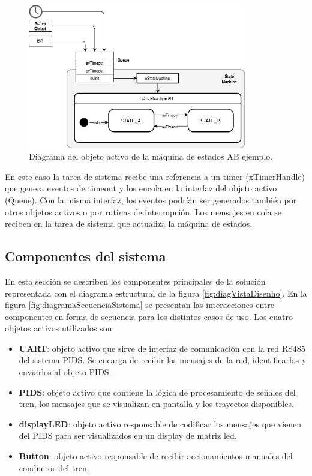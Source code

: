 \begin{figure}[ht]
	\centering
	\includegraphics[width=0.85\textwidth]{./Figures/AOstatemachineAB.png}
	\caption{Diagrama del objeto activo de la máquina de estados AB ejemplo.}
	\label{fig:AOfsmAB}
\end{figure}

En este caso la tarea de sistema recibe una referencia a un timer (xTimerHandle) que genera eventos de timeout y los encola en la interfaz del objeto activo (Queue). Con la misma interfaz, los eventos podrían ser generados también por otros objetos activos o por rutinas de interrupción. Los mensajes en cola se reciben en la tarea de sistema que actualiza la máquina de estados.\\

\subsection{Componentes del sistema}

En esta sección se describen los componentes principales de la solución representada con el diagrama estructural de la figura \ref{fig:diagVistaDisenho}. En la figura \ref{fig:diagramaSecuenciaSistema} se presentan las interacciones entre componentes en forma de secuencia para los distintos casos de uso. Los cuatro objetos activos utilizados son:\\
\begin{itemize}
\item \textbf{UART}: objeto activo que sirve de interfaz de comunicación con la red RS485 del sistema PIDS. Se encarga de recibir los mensajes de la red, identificarlos y enviarlos al objeto PIDS.
\item \textbf{PIDS}: objeto activo que contiene la lógica de procesamiento de señales del tren, los mensajes que se visualizan en pantalla y los trayectos disponibles. 
\item \textbf{displayLED}: objeto activo responsable de codificar los mensajes que vienen del PIDS para ser visualizados en un display de matriz led.
\item \textbf{Button}: objeto activo responsable de recibir accionamientos manuales del conductor del tren.
\end{itemize}

